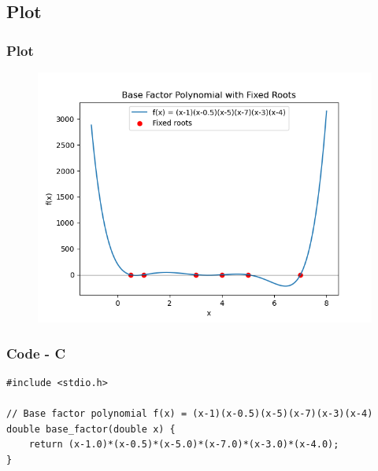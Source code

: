 \documentclass{beamer}
\theoremstyle{remark}
\numberwithin{equation}{section}
\begin{document}
\subsection{Plot}
\begin{frame}
    \frametitle{Plot}
\begin{figure}[H]
   \centering
   \includegraphics[width=0.8\columnwidth]{figs/poly_dim.png}
   \caption{}
   \label{}
   \end{figure}
\end{frame}

\begin{frame}[fragile]
    \frametitle{Code - C}
    \begin{lstlisting}
#include <stdio.h>

// Base factor polynomial f(x) = (x-1)(x-0.5)(x-5)(x-7)(x-3)(x-4)
double base_factor(double x) {
    return (x-1.0)*(x-0.5)*(x-5.0)*(x-7.0)*(x-3.0)*(x-4.0);
}



    \end{lstlisting}
    \end{frame}
\end{document}
